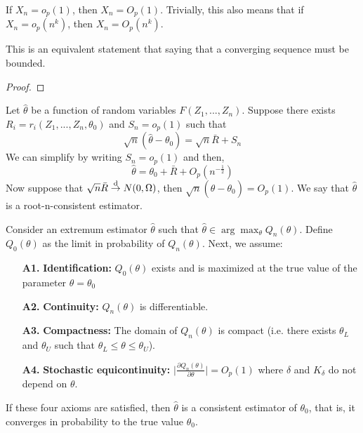 \begin{remark}
If $X_n = o_p(1)$, then $X_n = O_p(1)$. Trivially, this also means that if $X_n = o_p(n^k)$, then $X_n = O_p(n^k)$.
\end{remark} This is an equivalent statement that saying that a converging sequence must be bounded.
\begin{proof}

\end{proof}

\begin{definition}
Let $\hat\theta$ be a function of random variables $F(Z_1, ..., Z_n)$. Suppose there exists $R_i = r_i(Z_1, ..., Z_n, \theta_0)$ and $S_n = o_p(1)$ such that $$\sqrt{n}(\hat\theta - \theta_0) = \sqrt{n}\bar R + S_n $$We can simplify by writing $S_n = o_p(1)$ and then, $$\hat\theta = \theta_0 + \bar R + O_p(n^{-\frac{1}{2}}) $$Now suppose that $\sqrt{n}\bar R\overset{\text{d}}{\to} N(0, \Omega)$, then $\sqrt{n}(\hat\theta - \theta_0) = O_p(1)$. We say that $\hat\theta$ is a root-n-consistent estimator.
\end{definition}


\begin{theorem}
Consider an extremum estimator $\hat\theta$ such that  $\hat\theta \in \operatorname{arg}\max_{\theta} Q_n(\theta)$. Define $Q_0(\theta)$ as the limit in probability of $Q_n(\theta)$.
Next, we assume:\begin{itemize}
\item[\textbf{A1.}] \textbf{Identification:} $Q_0(\theta)$ exists and is maximized at the true value of the parameter $\theta = \theta_0$
\item[\textbf{A2.}] \textbf{Continuity:} $Q_n(\theta)$ is differentiable.
\item[\textbf{A3.}] \textbf{Compactness:} The domain of $Q_n(\theta)$ is compact (i.e. there exists $\theta_L$ and $\theta_U$ such that $\theta_L\leq \theta\leq\theta_U$).
\item[\textbf{A4.}] \textbf{Stochastic equicontinuity:} $\lvert \frac{\partial Q_n(\theta)}{\partial \theta}\rvert = O_p(1)$ where $\delta$ and $K_{\delta}$ do not depend on $\theta$.
\end{itemize}
If these four axioms are satisfied, then $\hat\theta$ is a consistent estimator of $\theta_0$, that is, it converges in probability to the true value $\theta_0$.
\end{theorem}

